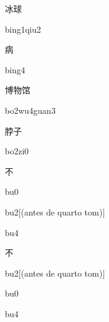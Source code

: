 \begin{verbete}{冰球}
\begin{pronuncia}{bing1qiu2}
\end{pronuncia}
\end{verbete}

\begin{verbete}[bing4]{病}
\begin{pronuncia}{bing4}
\end{pronuncia}
\end{verbete}

\begin{verbete}[bo2wu4guan3]{博物馆}
\begin{pronuncia}{bo2wu4guan3}
\end{pronuncia}
\end{verbete}

\begin{verbete}[bo2zi0]{脖子}
\begin{pronuncia}{bo2zi0}
\end{pronuncia}
\end{verbete}

\begin{verbete}[bu0]{不}
\begin{pronuncia}{bu0}
\end{pronuncia}
\begin{pronuncia}{bu2}[(antes de quarto tom)]
\end{pronuncia}
\begin{pronuncia}{bu4}
\end{pronuncia}
\end{verbete}

\begin{verbete}[bu2]{不}
\begin{pronuncia}{bu2}[(antes de quarto tom)]
\end{pronuncia}
\begin{pronuncia}{bu0}
\end{pronuncia}
\begin{pronuncia}{bu4}
\end{pronuncia}
\end{verbete}

